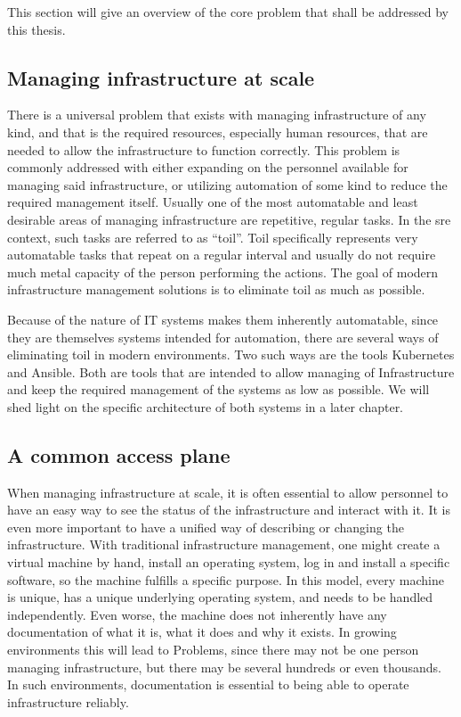 This section will give an overview of the core problem that shall be addressed by this thesis.

\subsection{Managing infrastructure at scale}
There is a universal problem that exists with managing infrastructure of any kind, and that is the required resources, especially human resources, that are needed to allow the infrastructure to function correctly.
This problem is commonly addressed with either expanding on the personnel available for managing said infrastructure, or utilizing automation of some kind to reduce the required management itself.
Usually one of the most automatable and least desirable areas of managing infrastructure are repetitive, regular tasks.
In the \gls{sre} context, such tasks are referred to as \enquote{toil}.
Toil specifically represents very automatable tasks that repeat on a regular interval and usually do not require much metal capacity of the person performing the actions.
The goal of modern infrastructure management solutions is to eliminate toil as much as possible.
\parencite{google-sre}

Because of the nature of \gls{IT} systems makes them inherently automatable, since they are themselves systems intended for automation, there are several ways of eliminating toil in modern environments.
Two such ways are the tools Kubernetes and Ansible.
Both are tools that are intended to allow managing of Infrastructure and keep the required management of the systems as low as possible.
We will shed light on the specific architecture of both systems in a later chapter.
\parencite{ansibledocsindex, k8swebsite}

\subsection{A common access plane}
When managing infrastructure at scale, it is often essential to allow personnel to have an easy way to see the status of the infrastructure and interact with it.
It is even more important to have a unified way of describing or changing the infrastructure.
With traditional infrastructure management, one might create a virtual machine by hand, install an operating system, log in and install a specific software, so the machine fulfills a specific purpose.
In this model, every machine is unique, has a unique underlying operating system, and needs to be handled independently.
Even worse, the machine does not inherently have any documentation of what it is, what it does and why it exists.
In growing environments this will lead to Problems, since there may not be one person managing infrastructure, but there may be several hundreds or even thousands.
In such environments, documentation is essential to being able to operate infrastructure reliably.
\parencite{platformengineering-architects}

